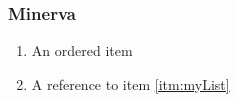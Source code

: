 \subsubsection*{Minerva}



\begin{enumerate}
\item An ordered item\label{itm:myList}
\item A reference to item \ref{itm:myList}
\end{enumerate}


